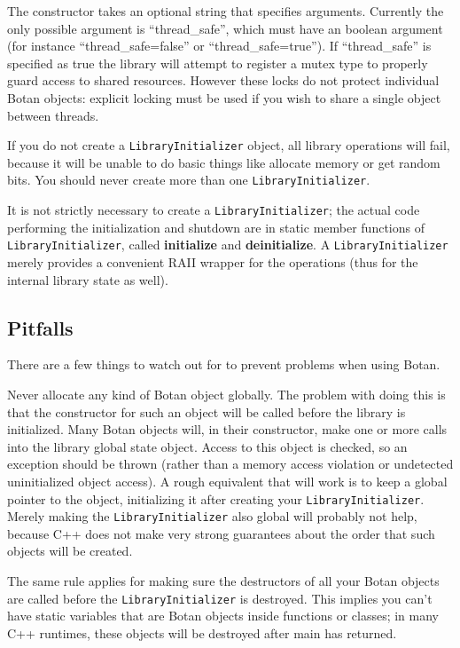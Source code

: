 \documentclass{article}
\newcommand{\function}[1]{\textbf{#1}}
\newcommand{\type}[1]{\texttt{#1}}
\begin{document}
The constructor takes an optional string that specifies arguments.
Currently the only possible argument is ``thread\_safe'', which must
have an boolean argument (for instance ``thread\_safe=false'' or
``thread\_safe=true''). If ``thread\_safe'' is specified as true the
library will attempt to register a mutex type to properly guard access
to shared resources. However these locks do not protect individual
Botan objects: explicit locking must be used if you wish to share a
single object between threads.

If you do not create a \type{LibraryInitializer} object, all library
operations will fail, because it will be unable to do basic things
like allocate memory or get random bits. You should never create more
than one \type{LibraryInitializer}.

It is not strictly necessary to create a \type{LibraryInitializer};
the actual code performing the initialization and shutdown are in
static member functions of \type{LibraryInitializer}, called
\function{initialize} and \function{deinitialize}. A
\type{LibraryInitializer} merely provides a convenient RAII wrapper
for the operations (thus for the internal library state as well).

\subsection{Pitfalls}

There are a few things to watch out for to prevent problems when using Botan.

Never allocate any kind of Botan object globally. The problem with
doing this is that the constructor for such an object will be called
before the library is initialized. Many Botan objects will, in their
constructor, make one or more calls into the library global state
object. Access to this object is checked, so an exception should be
thrown (rather than a memory access violation or undetected
uninitialized object access). A rough equivalent that will work is to
keep a global pointer to the object, initializing it after creating
your \type{LibraryInitializer}. Merely making the
\type{LibraryInitializer} also global will probably not help, because
C++ does not make very strong guarantees about the order that such
objects will be created.

The same rule applies for making sure the destructors of all your
Botan objects are called before the \type{LibraryInitializer} is
destroyed. This implies you can't have static variables that are Botan
objects inside functions or classes; in many C++ runtimes, these
objects will be destroyed after main has returned.
\end{document}
